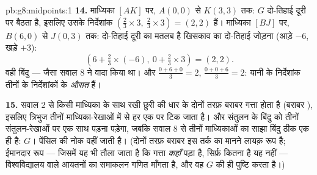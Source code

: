 \begin{solution}{pb:g8:midpoints:1}
\textbf{14.} माध्यिका $[AK]$ पर, $A(0,0)$ से $K(3,3)$ तक: $G$
दो-तिहाई दूरी पर बैठता है, इसलिए उसके निर्देशांक
$\left(\frac23 \times 3,\ \frac23 \times 3\right) = (2, 2)$ हैं।
माध्यिका $[BJ]$ पर, $B(6, 0)$ से $J(0, 3)$ तक: दो-तिहाई दूरी का
मतलब है खिसकाव का दो-तिहाई जोड़ना (आड़े $-6$, खड़े $+3$):
\[
\left(6 + \tfrac23 \times (-6),\ 0 + \tfrac23 \times 3\right)
= (2, 2) .
\]
वही बिंदु --- जैसा सवाल 8 ने वादा किया था। और
$\frac{0 + 6 + 0}{3} = 2$, $\frac{0 + 0 + 6}{3} = 2$: यानी  के निर्देशांक तीनों  के निर्देशांकों के \emph{औसत}
हैं।

\textbf{15.} सवाल 2 से किसी माध्यिका के साथ रखी छुरी की धार के
दोनों तरफ़ बराबर गत्ता होता है (बराबर ), इसलिए त्रिभुज
तीनों माध्यिका-रेखाओं में से हर एक पर टिक जाता है। और संतुलन के
बिंदु को तीनों संतुलन-रेखाओं पर एक साथ पड़ना पड़ेगा, जबकि सवाल 8 से
तीनों माध्यिकाओं का साझा बिंदु ठीक एक ही है: $G$। पेंसिल की नोक
वहीं जाती है। (दोनों तरफ़ बराबर  इस तर्क का मानने लायक़ रूप
है; ईमानदार रूप --- जिसमें यह भी तौला जाता है कि गत्ता \emph{कहाँ}
पड़ा है, सिर्फ़ कितना है यह नहीं --- विश्वविद्यालय वाले आयतनों का
समाकलन गणित माँगता है, और वह $G$ की ही पुष्टि करता है।)

\end{solution}
